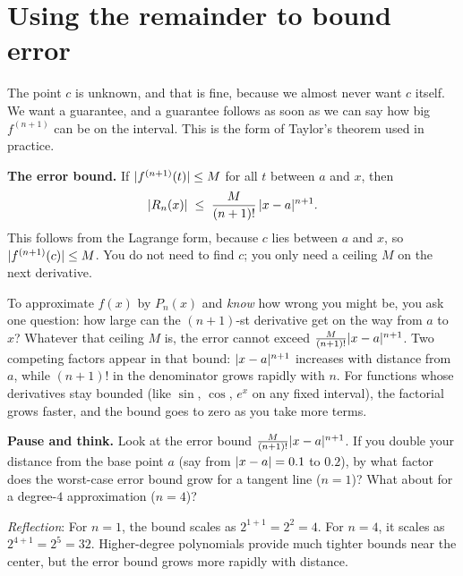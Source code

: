 \section{Using the remainder to bound error}

The point $c$ is unknown, and that is fine, because we almost never want $c$ itself.
We want a guarantee, and a guarantee follows as soon as we can say how big
$f^{(n+1)}$ can be on the interval. This is the form of Taylor's theorem used in
practice.

\begin{focusbox}
\textbf{The error bound.} If $\lvert f^{(n+1)}(t)\rvert \le M$ for all $t$ between $a$ and
$x$, then
\[
  \lvert R_n(x)\rvert \;\le\; \frac{M}{(n+1)!}\,\lvert x-a\rvert^{n+1}.
\]
This follows from the Lagrange form, because $c$ lies between $a$ and $x$, so
$\lvert f^{(n+1)}(c)\rvert \le M$. You do not need to find $c$; you only need a ceiling $M$
on the next derivative.
\end{focusbox}

To approximate $f(x)$ by $P_n(x)$ and \emph{know}
how wrong you might be, you ask one question: how large can the $(n+1)$-st derivative
get on the way from $a$ to $x$? Whatever that ceiling $M$ is, the error cannot exceed
$\frac{M}{(n+1)!}\lvert x-a\rvert^{n+1}$. Two competing factors appear in that bound:
$\lvert x-a\rvert^{n+1}$ increases with distance from $a$, while $(n+1)!$ in the denominator
grows rapidly with $n$. For functions whose derivatives stay bounded (like $\sin$, $\cos$,
$e^x$ on any fixed interval), the factorial grows faster, and the bound goes to
zero as you take more terms.

\begin{recoverybox}
\textbf{Pause and think.}
Look at the error bound $\frac{M}{(n+1)!}\lvert x-a\rvert^{n+1}$.
If you double your distance from the base point $a$ (say from $\lvert x-a\rvert=0.1$ to $0.2$),
by what factor does the worst-case error bound grow for a tangent line ($n=1$)?
What about for a degree-$4$ approximation ($n=4$)?

\emph{Reflection}: For $n=1$, the bound scales as $2^{1+1} = 2^2 = 4$. For $n=4$, it scales
as $2^{4+1} = 2^5 = 32$. Higher-degree polynomials provide much tighter bounds near the center,
but the error bound grows more rapidly with distance.
\end{recoverybox}

